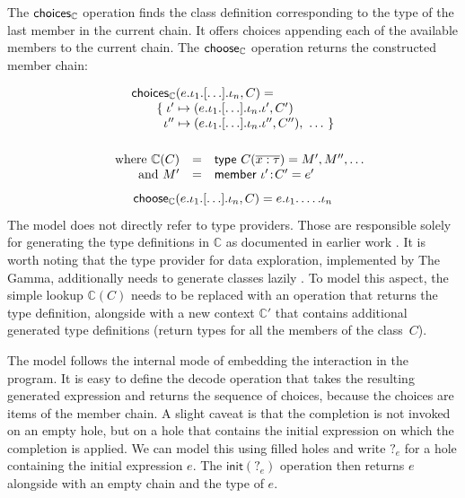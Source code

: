 \documentclass[a4paper,UKenglish,cleveref, autoref, thm-restate]{lipics-v2021}
\newcommand{\ident}[1]{\textsf{#1}}
\newcommand{\select}{\textnormal{\ident{choose}}}
\newcommand{\choices}{\textnormal{\ident{choices}}}
\begin{document}
The $\choices_\mathbb{C}$ operation finds the class definition corresponding to the type of the
last member in the current chain. It offers choices appending each of the available
members to the current chain. The $\select_\mathbb{C}$ operation returns the constructed
member chain:

\[
\begin{array}{l}
\choices_\mathbb{C}(e . \iota_1 . \lbrack\ldots\rbrack . \iota_n, C) =\\
\qquad \{\; \iota' \mapsto (e . \iota_1 . \lbrack\ldots\rbrack . \iota_n . \iota', C')\\
\qquad \;\; \iota'' \mapsto (e . \iota_1 . \lbrack\ldots\rbrack . \iota_n . \iota'', C''), ~\ldots~\}\\[1em]
\end{array}
\]\vspace{-2em}
\[
\begin{array}{rcl}
\quad \textnormal{where}~\mathbb{C}(C) &=& \ident{type}~C(\overline{x:\tau}) = M', M'', \ldots\\
\quad \textnormal{and}~M' &=& \ident{member}~\iota'\!:\!C'=e'
\end{array}
\]\vspace{-0.5em}
\[
\select_\mathbb{C}(e . \iota_1 . \lbrack\ldots\rbrack . \iota_n, C) = e . \iota_1 . \ldots . \iota_n
\]
The model does not directly refer to type providers. Those are responsible solely for generating
the type definitions in $\mathbb{C}$ as documented in earlier work \cite{petricek-2016-fsdata}.
It is worth noting that the type provider for data exploration, implemented by The Gamma,
additionally needs to generate classes lazily \cite{petricek-2017-dotdriven}. To model this aspect,
the simple lookup $\mathbb{C}(C)$ needs to be replaced with an operation that returns the type
definition, alongside with a new context $\mathbb{C}'$ that contains additional generated
type definitions (return types for all the members of the class~$C$).

The model follows the internal mode of embedding the interaction in the program. It is easy to
define the \ident{decode} operation that takes the resulting generated expression and returns the
sequence of choices, because the choices are items of the member chain. A slight caveat is that
the completion is not invoked on an empty hole, but on a hole that contains the initial expression
on which the completion is applied. We can model this using filled holes \cite{omar-2019-holes}
and write $?_e$ for a hole containing the initial expression $e$. The $\ident{init}(?_e)$ operation
then returns $e$ alongside with an empty chain and the type of $e$.
\end{document}
